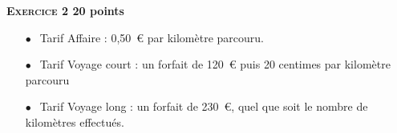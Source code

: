 \textbf{{\large \textsc{Exercice 2}} \hfill 20 points}

\bigskip

%
%

\begin{itemize}
\item[$\bullet~~$]Tarif \og Affaire \fg{} : 0,50~\euro{} par kilomètre parcouru.
\item[$\bullet~~$]Tarif \og Voyage court \fg{} : un forfait de 120~\euro{} puis 20 centimes par 
kilomètre parcouru
\item[$\bullet~~$]Tarif \og Voyage long \fg : un forfait de 230~\euro, quel que soit le nombre de kilomètres effectués.
\end{itemize}

\medskip


